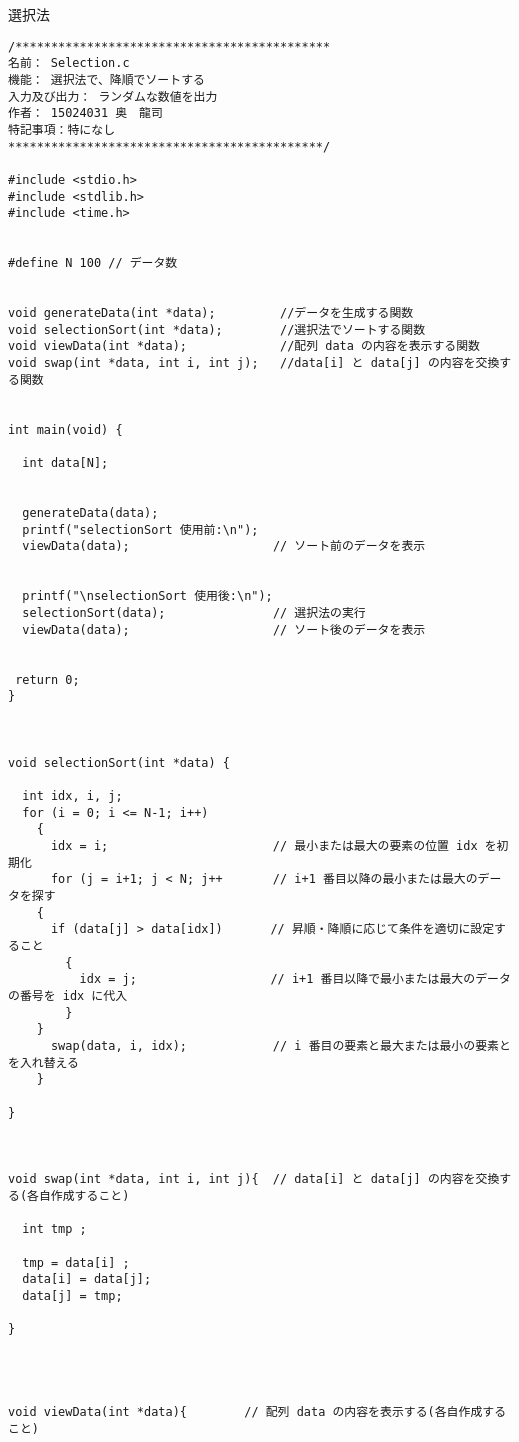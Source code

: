 \documentclass[a4j,titlepage]{jarticle}
\begin{document}
\begin{breakitembox}[l]{選択法} \small
\begin{verbatim}
/********************************************
名前： Selection.c
機能： 選択法で、降順でソートする
入力及び出力： ランダムな数値を出力
作者： 15024031 奥　龍司
特記事項：特になし
********************************************/

#include <stdio.h>
#include <stdlib.h>
#include <time.h>


#define N 100 // データ数


void generateData(int *data);         //データを生成する関数
void selectionSort(int *data);        //選択法でソートする関数
void viewData(int *data);             //配列 data の内容を表示する関数
void swap(int *data, int i, int j);   //data[i] と data[j] の内容を交換する関数


int main(void) {

  int data[N];
  
  
  generateData(data);
  printf("selectionSort 使用前:\n");
  viewData(data);                    // ソート前のデータを表示
  

  printf("\nselectionSort 使用後:\n");
  selectionSort(data);               // 選択法の実行
  viewData(data);                    // ソート後のデータを表示
  
  
 return 0;
}



void selectionSort(int *data) {

  int idx, i, j;
  for (i = 0; i <= N-1; i++)
    {
      idx = i;                       // 最小または最大の要素の位置 idx を初期化
      for (j = i+1; j < N; j++       // i+1 番目以降の最小または最大のデータを探す
	{                               
	  if (data[j] > data[idx])    　 // 昇順・降順に応じて条件を適切に設定すること
	    {
	      idx = j;                 　// i+1 番目以降で最小または最大のデータの番号を idx に代入
	    }
	}
      swap(data, i, idx);            // i 番目の要素と最大または最小の要素とを入れ替える
    }

}



void swap(int *data, int i, int j){  // data[i] と data[j] の内容を交換する(各自作成すること)

  int tmp ;

  tmp = data[i] ;
  data[i] = data[j];
  data[j] = tmp;
    
}




void viewData(int *data){        // 配列 data の内容を表示する(各自作成すること)


\end{verbatim}
\end{breakitembox}
\end{document}
